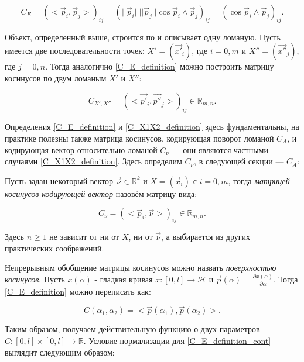 \begin{equation}
	{C}_{E} = {(<\vec{p}_{i}, \vec{p}_{j}>)}_{ij} = {(||\vec{p}_{i}|| ||\vec{p}_{j}|| \cos{\vec{p}_{i} \wedge \vec{p}_{j}})}_{ij} = {(\cos{\vec{p}_{i} \wedge \vec{p}_{j}})}_{ij}.
	\label{name_cosine}
\end{equation}

Объект, определенный выше, строится по и описывает одну ломаную. Пусть имеется две последовательности точек: $X' = (\vec{x'}_{i})$, где $i = \overline{0,m}$ и $X'' = (\vec{x''}_{j})$, где $j = \overline{0,n}$. Тогда аналогично \ref{C_E_definition} можно построить матрицу косинусов по двум ломаным $X'$ и $X''$:

\begin{equation}
	{C}_{X',X''} = {(<\vec{p'}_{i}, \vec{p''}_{j}>)}_{ij} \in \mathbb{R}_{m,n}.
	\label{C_X1X2_definition}
\end{equation}

Определения \ref{C_E_definition} и \ref{C_X1X2_definition} здесь фундаментальны, на практике полезны также матрица косинусов, кодирующая поворот ломаной $C_A$, и кодирующая вектор относительно ломаной ${C}_{\nu}$ --- они являются частными случаями \ref{C_X1X2_definition}. Здесь определим ${C}_{\nu}$, в следующей секции --- $C_A$:

Пусть задан некоторый вектор $\vec{\nu} \in \mathbb{R}^k$ и $X = (\vec{x}_{i})$ с $i = \overline{0,m}$, тогда \textit{матрицей косинусов кодирующей вектор} назовём матрицу вида:

\begin{equation}
	{C}_{\nu} = {(<\vec{p}_{i}, \vec{\nu}>)}_{ij} \in \mathbb{R}_{m,n}.
	\label{C_nu_definition}
\end{equation}

Здесь $n \ge 1$ не зависит от ни от $X$, ни от $\vec{\nu}$, а выбирается из других практических соображений.

Непрерывным обобщение матрицы косинусов можно назвать \textit{поверхностью косинусов}. Пусть $x(\alpha)$ - гладкая кривая $x : [0, l] \rightarrow \mathcal{H}$ и $\vec{p}(\alpha) = \frac{\partial{x(\alpha)}}{\partial{\alpha}}$. Тогда \ref{C_E_definition} можно переписать как:

\begin{equation}
	C({\alpha}_1, {\alpha}_2) = <\vec{p}(\alpha_1), \vec{p}(\alpha_2)>.
	\label{C_E_definition_cont}
\end{equation}

Таким образом, получаем действительную функцию о двух параметров $C : [0, l] \times [0, l] \rightarrow \mathbb{R}$.
Условие нормализации для \ref{C_E_definition_cont} выглядит следующим образом:

